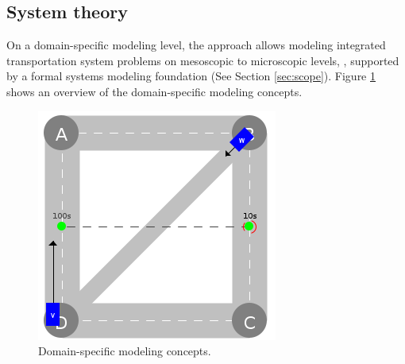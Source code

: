 \documentclass[a4paper,twoside]{article}
\begin{document}
	
	
	\subsection{System theory}
	\label{sec:domain-specific-modeling}
	
	
	On a domain-specific modeling level, the approach allows modeling integrated transportation system problems on mesoscopic to microscopic levels, \cite{ascher_hackenberg_2014,ascher_hackenberg_2015}, supported by a formal systems modeling foundation \cite{ascher_hackenberg_2016,ascher_hackenberg_2017} (See Section  \ref{sec:scope}).
	Figure \ref{fig:domain-specific-modeling} shows an overview of the domain-specific modeling concepts.
	\begin{figure}[!ht]
		\centering
		\includegraphics[width=0.6\columnwidth]{../../events/demand.png}
		\caption{Domain-specific modeling concepts.}
		\label{fig:domain-specific-modeling}
	\end{figure}
	
\end{document}
